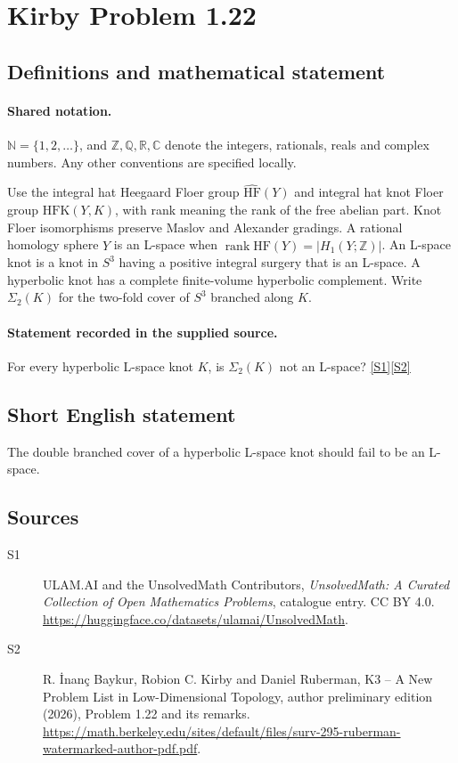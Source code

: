 \documentclass[11pt]{article}
\newcommand{\sref}[2]{\hyperlink{source:#1:#2}{[S#2]}}
\begin{document}
\section{Kirby Problem 1.22}\label{statement}

\subsection{Definitions and mathematical statement}

\paragraph{Shared notation.}$\mathbb N=\{1,2,\ldots\}$, and $\mathbb Z,\mathbb Q,\mathbb R,\mathbb C$ denote the integers, rationals, reals and complex numbers. Any other conventions are specified locally.


Use the integral hat Heegaard Floer group $\widehat{\mathrm{HF}}(Y)$ and integral hat knot Floer group $\widehat{\mathrm{HFK}}(Y,K)$, with rank meaning the rank of the free abelian part. Knot Floer isomorphisms preserve Maslov and Alexander gradings. A rational homology sphere $Y$ is an L-space when $\operatorname{rank}\widehat{\mathrm{HF}}(Y)=|H_1(Y;\mathbb Z)|$. An L-space knot is a knot in $S^3$ having a positive integral surgery that is an L-space. A hyperbolic knot has a complete finite-volume hyperbolic complement. Write $\Sigma_2(K)$ for the two-fold cover of $S^3$ branched along $K$.
\paragraph{Statement recorded in the supplied source.}
For every hyperbolic L-space knot $K$, is $\Sigma_2(K)$ not an L-space? \sref{statement}{1}\sref{statement}{2}
\subsection{Short English statement}
The double branched cover of a hyperbolic L-space knot should fail to be an L-space.
\subsection{Sources}
\begin{description}
\item[\hypertarget{source:statement:1}{S1}] ULAM.AI and the UnsolvedMath Contributors, \emph{UnsolvedMath: A Curated Collection of Open Mathematics Problems}, catalogue entry. CC BY 4.0. \url{https://huggingface.co/datasets/ulamai/UnsolvedMath}.
\item[\hypertarget{source:statement:2}{S2}] R. \.{I}nan\c{c} Baykur, Robion C. Kirby and Daniel Ruberman, K3 -- A New Problem List in Low-Dimensional Topology, author preliminary edition (2026), Problem 1.22 and its remarks. \url{https://math.berkeley.edu/sites/default/files/surv-295-ruberman-watermarked-author-pdf.pdf}.
\end{description}
\label{end:statement}
\end{document}
